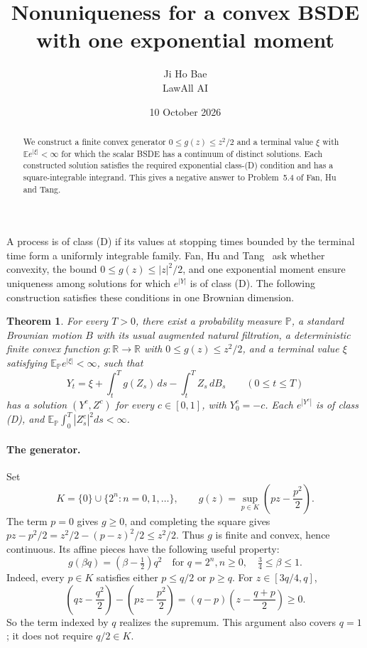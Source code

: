 \documentclass[11pt]{article}
\title{Nonuniqueness for a convex BSDE\protect\\ with one exponential moment}
\author{Ji Ho Bae\\\small LawAll AI}
\date{10 October 2026}
\newtheorem{theorem}{Theorem}
\newcommand{\E}{\mathbb E}
\newcommand{\Pp}{\mathbb P}
\begin{document}
\maketitle
\begin{abstract}
We construct a finite convex generator $0\leq g(z)\leq z^2/2$ and a terminal value $\xi$ with $\E e^{|\xi|}<\infty$ for which the scalar BSDE has a continuum of distinct solutions. Each constructed solution satisfies the required exponential class-(D) condition and has a square-integrable integrand. This gives a negative answer to Problem~5.4 of Fan, Hu and Tang.
\end{abstract}

A process is of class (D) if its values at stopping times bounded by the terminal time form a uniformly integrable family. Fan, Hu and Tang~\cite[Problem~5.4, equation~(5.3)]{FHT} ask whether convexity, the bound $0\leq g(z)\leq |z|^2/2$, and one exponential moment ensure uniqueness among solutions for which $e^{|Y|}$ is of class (D). The following construction satisfies these conditions in one Brownian dimension.

\begin{theorem}\label{thm:main}
For every $T>0$, there exist a probability measure $\Pp$, a standard Brownian motion $B$ with its usual augmented natural filtration, a deterministic finite convex function $g:\mathbb R\to\mathbb R$ with $0\leq g(z)\leq z^2/2$, and a terminal value $\xi$ satisfying $\E_{\Pp}e^{|\xi|}<\infty$, such that
\begin{equation}\label{eq:bsde}
 Y_t=\xi+\int_t^T g(Z_s)\,ds-\int_t^T Z_s\,dB_s
 \qquad(0\leq t\leq T)
\end{equation}
has a solution $(Y^c,Z^c)$ for every $c\in[0,1]$, with $Y^c_0=-c$. Each $e^{|Y^c|}$ is of class (D), and $\E_{\Pp}\int_0^T|Z^c_s|^2ds<\infty$.
\end{theorem}

\paragraph{The generator.}
Set
\begin{equation}\label{eq:generator}
 K=\{0\}\cup\{2^n:n=0,1,\ldots\},\qquad
 g(z)=\sup_{p\in K}\left(pz-\frac{p^2}{2}\right).
\end{equation}
The term $p=0$ gives $g\geq0$, and completing the square gives
$pz-p^2/2=z^2/2-(p-z)^2/2\leq z^2/2$. Thus $g$ is finite and convex, hence continuous. Its affine pieces have the following useful property:
\begin{equation}\label{eq:face}
 g(\beta q)=(\beta-\tfrac12)q^2
 \quad\text{for }q=2^n, n\geq0,\quad \tfrac34\leq\beta\leq1.
\end{equation}
Indeed, every $p\in K$ satisfies either $p\leq q/2$ or $p\geq q$. For $z\in[3q/4,q]$,
\[
 \left(qz-\frac{q^2}{2}\right)-
 \left(pz-\frac{p^2}{2}\right)
 =(q-p)\left(z-\frac{q+p}{2}\right)\geq0.
\]
So the term indexed by $q$ realizes the supremum. This argument also covers $q=1$; it does not require $q/2\in K$.
\end{document}
